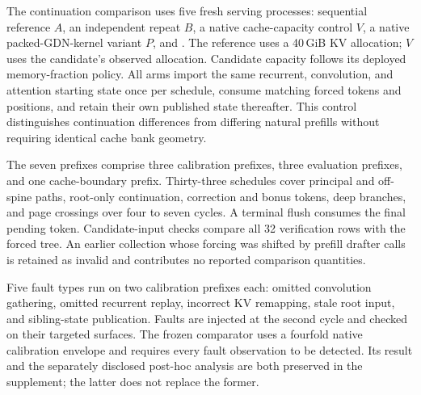 The continuation comparison uses five fresh serving processes: sequential reference $A$, an independent repeat $B$, a native cache-capacity control $V$, a native packed-GDN-kernel variant $P$, and \sys{}. The reference uses a 40\,GiB KV allocation; $V$ uses the candidate's observed allocation. Candidate capacity follows its deployed memory-fraction policy. All arms import the same recurrent, convolution, and attention starting state once per schedule, consume matching forced tokens and positions, and retain their own published state thereafter. This control distinguishes continuation differences from differing natural prefills without requiring identical cache bank geometry.

The seven prefixes comprise three calibration prefixes, three evaluation prefixes, and one cache-boundary prefix. Thirty-three schedules cover principal and off-spine paths, root-only continuation, correction and bonus tokens, deep branches, and page crossings over four to seven cycles. A terminal flush consumes the final pending token. Candidate-input checks compare all 32 verification rows with the forced tree. An earlier collection whose forcing was shifted by prefill drafter calls is retained as invalid and contributes no reported comparison quantities.

Five fault types run on two calibration prefixes each: omitted convolution gathering, omitted recurrent replay, incorrect KV remapping, stale root input, and sibling-state publication. Faults are injected at the second cycle and checked on their targeted surfaces. The frozen comparator uses a fourfold native calibration envelope and requires every fault observation to be detected. Its result and the separately disclosed post-hoc analysis are both preserved in the supplement; the latter does not replace the former.
